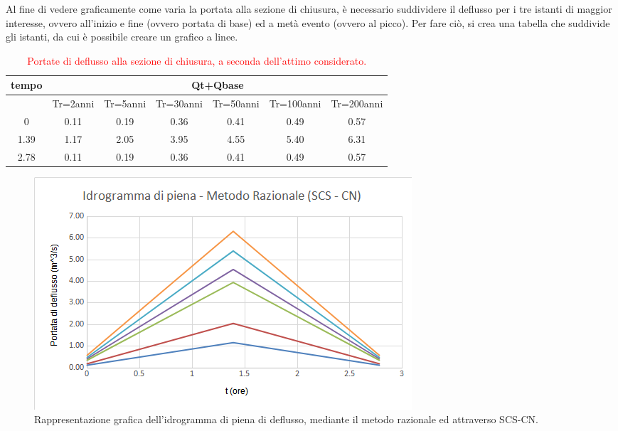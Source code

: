 Al fine di vedere graficamente come varia la portata alla sezione di chiusura, è necessario suddividere il deflusso per i tre istanti di maggior interesse, ovvero all'inizio e fine (ovvero portata di base) ed a metà evento (ovvero al picco). Per fare ciò, si crea una tabella che suddivide gli istanti, da cui è possibile creare un grafico a linee.

\begin{table}[H] \centering
    \caption{\textcolor{red}{Portate di deflusso alla sezione di chiusura, a seconda dell'attimo considerato.}}
    \begin{tabular}{ccccccc}
        \toprule
    tempo & \multicolumn{6}{c}{Qt+Qbase}           \\
    \midrule
& Tr=2anni & Tr=5anni & Tr=30anni & Tr=50anni & Tr=100anni & Tr=200anni \\
0 & 0.11  & 0.19     & 0.36      & 0.41      & 0.49       & 0.57       \\ 1.39 & 1.17  & 2.05  & 3.95      & 4.55      & 5.40       & 6.31       \\
2.78 & 0.11 & 0.19     & 0.36      & 0.41      & 0.49       & 0.57 \\
\bottomrule     
    \end{tabular}
    \end{table}

\begin{figure}[H]  \centering
        \includegraphics[scale=0.75]{immagini/metodo_razionale_scs_cn.png}
        \caption{Rappresentazione grafica dell'idrogramma di piena di deflusso, mediante il metodo razionale ed attraverso SCS-CN.}
        \label{metodo_razionale_scs_cn}
\end{figure}

